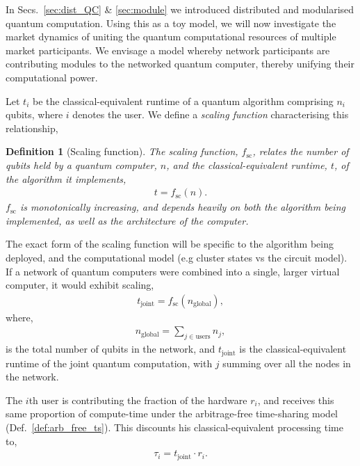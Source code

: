 \documentclass[aps, rmp, twocolumn, amsmath, amssymb, nofootinbib, superscriptaddress, longbibliography, floatfix, table-of-contents, eqsecnum]{revtex4-1}
\newtheorem{definition}{Definition}
\begin{document}
In Secs.~\ref{sec:dist_QC} \& \ref{sec:module} we introduced distributed and modularised quantum computation. Using this as a toy model, we will now investigate the market dynamics of uniting the quantum computational resources of multiple market participants. We envisage a model whereby network participants are contributing modules to the networked quantum computer, thereby unifying their computational power.

Let $t_i$ be the classical-equivalent runtime of a quantum algorithm comprising $n_i$ qubits, where $i$ denotes the user. We define a \emph{scaling function} characterising this relationship,

\begin{definition}[Scaling function] \label{def:scaling_func} 
The scaling function, $f_\text{sc}$, relates the number of qubits held by a quantum computer, $n$, and the classical-equivalent runtime, $t$, of the algorithm it implements,
\begin{align}
t = f_\text{sc}(n).	
\end{align}
	$f_\text{sc}$ is monotonically increasing, and depends heavily on both the algorithm being implemented, as well as the architecture of the computer.
\end{definition}

The exact form of the scaling function will be specific to the algorithm being deployed, and the computational model (e.g cluster states vs the circuit model). If a network of quantum computers were combined into a single, larger virtual computer, it would exhibit scaling,
\begin{align}
t_\text{joint} = f_\text{sc}(n_\text{global}),
\end{align}
where,
\begin{align}
n_\text{global} = \sum_{j\in\text{users}} n_j,
\end{align}
is the total number of qubits in the network, and $t_\text{joint}$ is the classical-equivalent runtime of the joint quantum computation, with $j$ summing over all the nodes in the network.

The $i$th user is contributing the fraction of the hardware $r_i$, and receives this same proportion of compute-time under the arbitrage-free time-sharing model (Def.~\ref{def:arb_free_ts}). This discounts his classical-equivalent processing time to,
\begin{align}
\tau_i = t_\text{joint} \cdot r_i.
\end{align}
\end{document}
